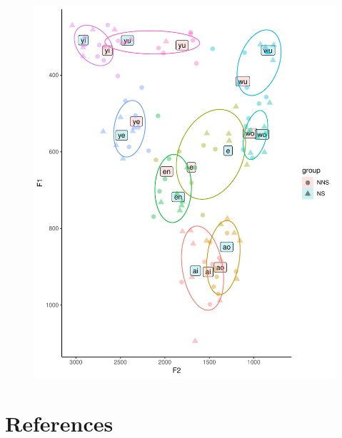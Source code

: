 \documentclass[man, fleqn, noextraspace]{apa6}
\begin{document}
\begin{figure}
\centering
\includegraphics{Vowel_v2_files/figure-latex/figure6-1.pdf}
\caption{}
\end{figure}

\newpage

\section{References}\label{references}

\begingroup
\setlength{\parindent}{-0.5in} \setlength{\leftskip}{0.5in}

\hypertarget{refs}{}

\endgroup
\end{document}
